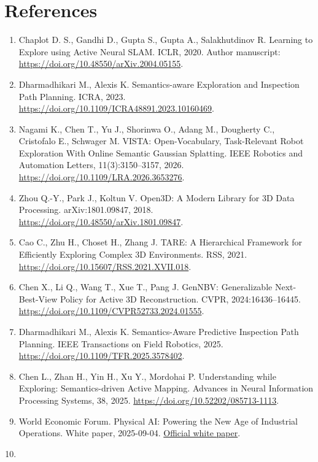\documentclass[11pt,a4paper]{article}
\begin{document}
\hypertarget{references}{%
\section*{References}\label{references}}

\begin{enumerate}
\def\labelenumi{\arabic{enumi}.}
\item
  Chaplot D. S., Gandhi D., Gupta S., Gupta A., Salakhutdinov R. Learning to Explore using Active Neural SLAM. ICLR, 2020. Author manuscript: \url{https://doi.org/10.48550/arXiv.2004.05155}.
\item
  Dharmadhikari M., Alexis K. Semantics-aware Exploration and Inspection Path Planning. ICRA, 2023. \url{https://doi.org/10.1109/ICRA48891.2023.10160469}.
\item
  Nagami K., Chen T., Yu J., Shorinwa O., Adang M., Dougherty C., Cristofalo E., Schwager M. VISTA: Open-Vocabulary, Task-Relevant Robot Exploration With Online Semantic Gaussian Splatting. IEEE Robotics and Automation Letters, 11(3):3150--3157, 2026. \url{https://doi.org/10.1109/LRA.2026.3653276}.
\item
  Zhou Q.-Y., Park J., Koltun V. Open3D: A Modern Library for 3D Data Processing. arXiv:1801.09847, 2018. \url{https://doi.org/10.48550/arXiv.1801.09847}.
\item
  Cao C., Zhu H., Choset H., Zhang J. TARE: A Hierarchical Framework for Efficiently Exploring Complex 3D Environments. RSS, 2021. \url{https://doi.org/10.15607/RSS.2021.XVII.018}.
\item
  Chen X., Li Q., Wang T., Xue T., Pang J. GenNBV: Generalizable Next-Best-View Policy for Active 3D Reconstruction. CVPR, 2024:16436--16445. \url{https://doi.org/10.1109/CVPR52733.2024.01555}.
\item
  Dharmadhikari M., Alexis K. Semantics-Aware Predictive Inspection Path Planning. IEEE Transactions on Field Robotics, 2025. \url{https://doi.org/10.1109/TFR.2025.3578402}.
\item
  Chen L., Zhan H., Yin H., Xu Y., Mordohai P. Understanding while Exploring: Semantics-driven Active Mapping. Advances in Neural Information Processing Systems, 38, 2025. \url{https://doi.org/10.52202/085713-1113}.
\item
  World Economic Forum. Physical AI: Powering the New Age of Industrial Operations. White paper, 2025-09-04. \href{https://www.weforum.org/publications/physical-ai-powering-the-new-age-of-industrial-operations/}{Official white paper}.
\item

\end{enumerate}
\end{document}
